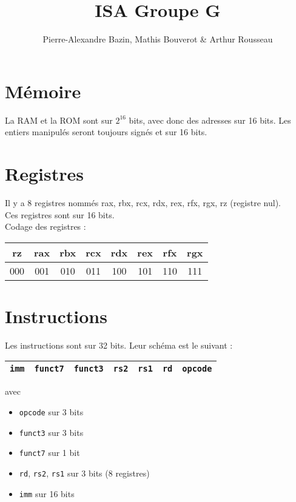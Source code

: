 \documentclass[a4paper]{article}
\title{ISA Groupe G}
\author{Pierre-Alexandre Bazin, Mathis Bouverot \& Arthur Rousseau}
\date{}
\begin{document}
    \maketitle
    \section{Mémoire}
    La RAM et la ROM sont sur \(2^{16}\) bits, avec donc des adresses sur 16 bits. Les entiers manipulés seront toujours signés et sur 16 bits.
    
    \section{Registres}
    Il y a 8 registres nommés rax, rbx, rcx, rdx, rex, rfx, rgx, rz (registre nul).\\
    Ces registres sont sur 16 bits.\\
    Codage des registres :

    \begin{tabular}{|c|c|c|c|c|c|c|c|}
        \hline
        rz  & rax & rbx & rcx & rdx & rex & rfx & rgx \\
        \hline
        000 & 001 & 010 & 011 & 100 & 101 & 110 & 111 \\
        \hline  
    \end{tabular}

    \section{Instructions}
    Les instructions sont sur 32 bits. Leur schéma est le suivant :

    \begin{tabular}{|c|c|c|c|c|c|c|}
        \hline
        \texttt{imm} & \texttt{funct7} & \texttt{funct3} & \texttt{rs2} & \texttt{rs1} & \texttt{rd} & \texttt{opcode} \\
        \hline
    \end{tabular}

    avec \begin{itemize}
        \item \texttt{opcode} sur 3 bits
        \item \texttt{funct3} sur 3 bits
        \item \texttt{funct7} sur 1 bit 
        \item \texttt{rd}, \texttt{rs2}, \texttt{rs1} sur 3 bits (8 registres)
        \item \texttt{imm} sur 16 bits
    \end{itemize}
\end{document}
